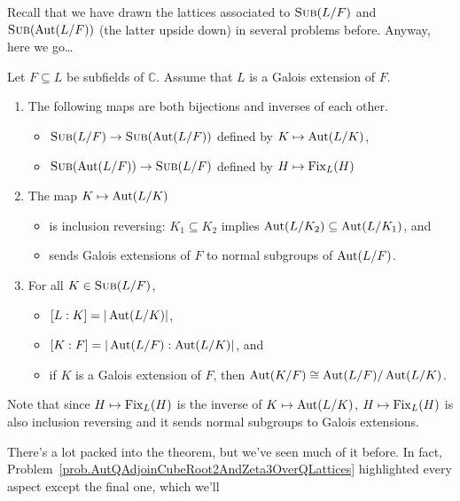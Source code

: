 Recall that we have drawn the lattices associated to $\operatorname{\textsc{Sub}}(L/F)$ and $\operatorname{\textsc{Sub}}(\operatorname{Aut}(L/F))$ (the latter upside down) in several problems before. Anyway, here we go\ldots

\begin{fact}\label{fact.FTGT}
Let $F\subseteq L$ be subfields of $\mathbb{C}$. Assume that $L$ is a Galois extension of $F$. \begin{enumerate}
\item The following maps are both bijections and inverses of each other.
\begin{itemize}
\item $\operatorname{\textsc{Sub}}(L/F)\to \operatorname{\textsc{Sub}}(\operatorname{Aut}(L/F))$ defined by $K\mapsto \operatorname{Aut}(L/K)$,
\item $\operatorname{\textsc{Sub}}(\operatorname{Aut}(L/F))\to \operatorname{\textsc{Sub}}(L/F)$ defined by $H\mapsto \operatorname{Fix}_L(H)$
\end{itemize} 
\item The map $K\mapsto \operatorname{Aut}(L/K)$ 
\begin{itemize}
\item is inclusion reversing: $K_1\subseteq K_2$ implies $\operatorname{Aut}(L/K_2) \subseteq \operatorname{Aut}(L/K_1)$, and
\item sends Galois extensions of $F$ to normal subgroups of $\operatorname{Aut}(L/F)$.
\end{itemize}
\item For all $K\in \operatorname{\textsc{Sub}}(L/F)$, 
\begin{itemize}
\item $[L:K] = |\operatorname{Aut}(L/K)|$,
\item  $[K:F] = |\operatorname{Aut}(L/F):\operatorname{Aut}(L/K)|$, and 
\item if $K$ is a Galois extension of $F$, then $\operatorname{Aut}(K/F)\cong \operatorname{Aut}(L/F)/\operatorname{Aut}(L/K)$.
\end{itemize}
\end{enumerate}
\end{fact}

Note that since $H\mapsto \operatorname{Fix}_L(H)$ is the inverse of $K\mapsto \operatorname{Aut}(L/K)$, $H\mapsto \operatorname{Fix}_L(H)$ is also inclusion reversing and it sends normal subgroups to Galois extensions. 

There's a lot packed into the theorem, but we've seen much of it before. In fact, Problem~\ref{prob.AutQAdjoinCubeRoot2AndZeta3OverQLattices} highlighted every aspect except the final one, which we'll 

